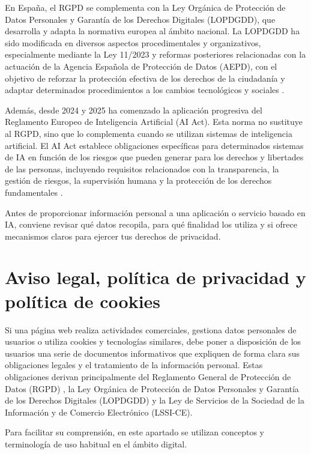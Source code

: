 \documentclass[
  spanish,
  a4paper,
  openany]{book}
\begin{document}
En España, el RGPD se complementa con la Ley Orgánica de Protección de Datos Personales y Garantía de los Derechos Digitales (LOPDGDD), que desarrolla y adapta la normativa europea al ámbito nacional. La LOPDGDD ha sido modificada en diversos aspectos procedimentales y organizativos, especialmente mediante la Ley 11/2023 y reformas posteriores relacionadas con la actuación de la Agencia Española de Protección de Datos (AEPD), con el objetivo de reforzar la protección efectiva de los derechos de la ciudadanía y adaptar determinados procedimientos a los cambios tecnológicos y sociales \citep{AEPD-lopdgdd-modificacion}.

Además, desde 2024 y 2025 ha comenzado la aplicación progresiva del Reglamento Europeo de Inteligencia Artificial (AI Act). Esta norma no sustituye al RGPD, sino que lo complementa cuando se utilizan sistemas de inteligencia artificial. El AI Act establece obligaciones específicas para determinados sistemas de IA en función de los riesgos que pueden generar para los derechos y libertades de las personas, incluyendo requisitos relacionados con la transparencia, la gestión de riesgos, la supervisión humana y la protección de los derechos fundamentales \citep{UE-AIAct}.

Antes de proporcionar información personal a una aplicación o servicio basado en IA, conviene revisar qué datos recopila, para qué finalidad los utiliza y si ofrece mecanismos claros para ejercer tus derechos de privacidad.

\section{Aviso legal, política de privacidad y política de cookies}\label{aviso-legal-poluxedtica-de-privacidad-y-poluxedtica-de-cookies}

Si una página web realiza actividades comerciales, gestiona datos personales de usuarios o utiliza cookies y tecnologías similares, debe poner a disposición de los usuarios una serie de documentos informativos que expliquen de forma clara sus obligaciones legales y el tratamiento de la información personal. Estas obligaciones derivan principalmente del Reglamento General de Protección de Datos (RGPD) \citep{RGPD}, la Ley Orgánica de Protección de Datos Personales y Garantía de los Derechos Digitales (LOPDGDD) \citep{LOPDGDD} y la Ley de Servicios de la Sociedad de la Información y de Comercio Electrónico (LSSI-CE).

Para facilitar su comprensión, en este apartado se utilizan conceptos y terminología de uso habitual en el ámbito digital.
\end{document}
